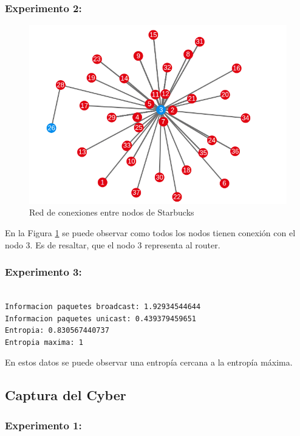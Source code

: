 \subsubsection{Experimento 2:}

\begin{figure}[H]
  \centering
    \includegraphics[scale=0.45]{imagenes/graficos/grafos/starbucks.png}
  \caption{Red de conexiones entre nodos de Starbucks}
  \label{fig:14}
\end{figure}

En la Figura \ref{fig:14} se puede observar como todos los nodos tienen conexión con el nodo 3. Es de resaltar, que el nodo 3 representa al router.

\subsubsection{Experimento 3:}
\begin{verbatim}

Informacion paquetes broadcast: 1.92934544644
Informacion paquetes unicast: 0.439379459651
Entropia: 0.830567440737
Entropia maxima: 1

\end{verbatim}

En estos datos se puede observar una entropía cercana a la entropía máxima.

\subsection{Captura del Cyber}

\subsubsection{Experimento 1:}

